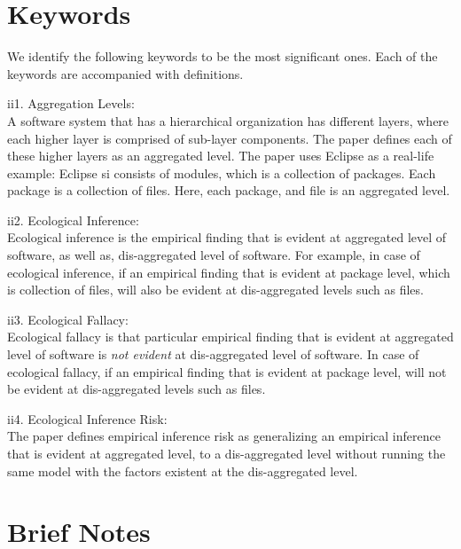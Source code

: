 \documentclass[12pt]{article}
\begin{document}
\section{Keywords}
\label{keywords}
We identify the following keywords to be the most significant ones.  Each of the keywords 
are accompanied with definitions. 

\begin{itemize}
\begin{item}
ii1. Aggregation Levels: \\
A software system that has a hierarchical organization has different layers, where
each higher layer is comprised of sub-layer components.  The paper defines 
each of these higher layers as an aggregated level. The paper uses Eclipse as a real-life
example: Eclipse si consists of modules, which is a collection of packages. Each package 
is a collection of files. Here, each package, and file is an aggregated level.   
\end{item}
\begin{item}
ii2. Ecological Inference: \\
Ecological inference is the empirical finding that is evident at aggregated level of 
software, as well as, dis-aggregated level of software. For example, in case of ecological inference, if an empirical finding that is evident at package level, which is collection of
files, will also be evident at dis-aggregated levels such as files. 
\end{item}
\begin{item}
ii3. Ecological Fallacy: \\
Ecological fallacy is that particular empirical finding that is evident at aggregated level of software is \textit{not evident} at dis-aggregated level of software. In case of ecological fallacy, if an empirical finding that is evident at package level, will not be evident at dis-aggregated levels such as files. 
\end{item}
\begin{item}
ii4. Ecological Inference Risk: \\
The paper defines empirical inference risk as generalizing an empirical inference that is 
evident at aggregated level, to a dis-aggregated level without running 
the same model with the factors existent at the dis-aggregated level. 
\end{item}
\end{itemize} 

\section{Brief Notes}
\label{brief}
\end{document}
